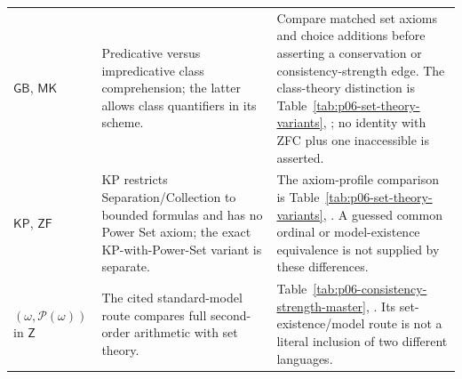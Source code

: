 \begin{longtable}{@{}p{}p{}p{}@{}}
\addlinespace
\(\mathsf{GB}\), \(\mathsf{MK}\) & Predicative versus impredicative
class comprehension; the latter allows class quantifiers in its scheme. &
Compare matched set axioms and choice additions before asserting a
conservation or consistency-strength edge. The class-theory distinction is
Table~\ref{tab:p06-set-theory-variants}, \cite{Kelley1975}; no identity with
ZFC plus one inaccessible is asserted. \\
\addlinespace
\(\mathsf{KP}\), \(\mathsf{ZF}\) &
KP restricts Separation/Collection to bounded formulas and has no Power Set
axiom; the exact KP-with-Power-Set variant is separate. &
The axiom-profile comparison is Table~\ref{tab:p06-set-theory-variants},
\cite{Barwise1975}. A guessed common ordinal or model-existence equivalence
is not supplied by these differences. \\
\addlinespace
\((\omega,\mathcal P(\omega))\) in \(\mathsf Z\) &
The cited standard-model route compares full second-order arithmetic with
set theory. & Table~\ref{tab:p06-consistency-strength-master},
\cite{Jech2003,Simpson2009}. Its set-existence/model route is not a
literal inclusion of two different languages. \\
\bottomrule
\end{longtable}
\endgroup

